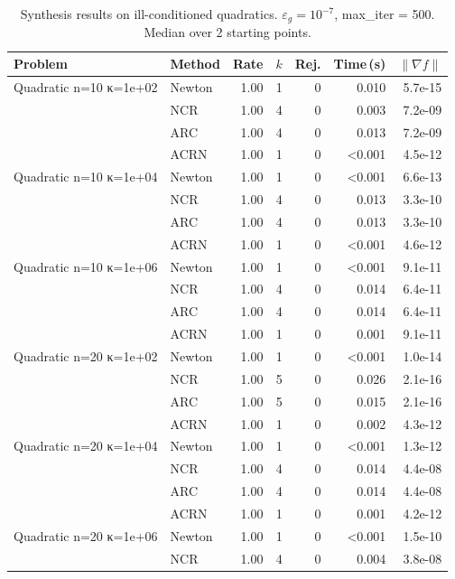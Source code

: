 \begin{table}[ht]
  \centering
  \caption{Synthesis results on ill-conditioned quadratics. $\varepsilon_g = 10^{-7}$, max\_iter = 500. Median over 2 starting points.}
  \label{tab:synth_illcond}
  \begin{tabular}{|l|l|r|r|r|r|r|}
    \hline
    \textbf{Problem} & \textbf{Method} & \textbf{Rate} & \textbf{$k$} & \textbf{Rej.} & \textbf{Time\,(s)} & \textbf{$\|\nabla f\|$} \\
    \hline\hline
    Quadratic n=10 κ=1e+02 & Newton & 1.00 & 1 & 0 & 0.010 & 5.7e-15 \\
     & NCR & 1.00 & 4 & 0 & 0.003 & 7.2e-09 \\
     & ARC & 1.00 & 4 & 0 & 0.013 & 7.2e-09 \\
     & ACRN & 1.00 & 1 & 0 & <0.001 & 4.5e-12 \\
    \hline
    Quadratic n=10 κ=1e+04 & Newton & 1.00 & 1 & 0 & <0.001 & 6.6e-13 \\
     & NCR & 1.00 & 4 & 0 & 0.013 & 3.3e-10 \\
     & ARC & 1.00 & 4 & 0 & 0.013 & 3.3e-10 \\
     & ACRN & 1.00 & 1 & 0 & <0.001 & 4.6e-12 \\
    \hline
    Quadratic n=10 κ=1e+06 & Newton & 1.00 & 1 & 0 & <0.001 & 9.1e-11 \\
     & NCR & 1.00 & 4 & 0 & 0.014 & 6.4e-11 \\
     & ARC & 1.00 & 4 & 0 & 0.014 & 6.4e-11 \\
     & ACRN & 1.00 & 1 & 0 & 0.001 & 9.1e-11 \\
    \hline
    Quadratic n=20 κ=1e+02 & Newton & 1.00 & 1 & 0 & <0.001 & 1.0e-14 \\
     & NCR & 1.00 & 5 & 0 & 0.026 & 2.1e-16 \\
     & ARC & 1.00 & 5 & 0 & 0.015 & 2.1e-16 \\
     & ACRN & 1.00 & 1 & 0 & 0.002 & 4.3e-12 \\
    \hline
    Quadratic n=20 κ=1e+04 & Newton & 1.00 & 1 & 0 & <0.001 & 1.3e-12 \\
     & NCR & 1.00 & 4 & 0 & 0.014 & 4.4e-08 \\
     & ARC & 1.00 & 4 & 0 & 0.014 & 4.4e-08 \\
     & ACRN & 1.00 & 1 & 0 & 0.001 & 4.2e-12 \\
    \hline
    Quadratic n=20 κ=1e+06 & Newton & 1.00 & 1 & 0 & <0.001 & 1.5e-10 \\
     & NCR & 1.00 & 4 & 0 & 0.004 & 3.8e-08 \\

\end{tabular}
\end{table}
